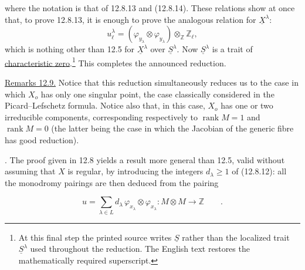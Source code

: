 \noindent
where the notation is that of 12.8.13 and (12.8.14). These relations show
at once that, to prove 12.8.13, it is enough to prove the analogous
relation for $\underline X^\lambda$:
\[
 u_\ell^\lambda=
 (\varphi_{y_\lambda}\otimes\varphi_{y_\lambda})
 \otimes_{\mathbb Z}\mathbb Z_\ell,
\]
which is nothing other than 12.5 for $\underline X^\lambda$ over
$\underline S^\lambda$. Now $\underline S^\lambda$ is a trait of
\underline{characteristic zero}.\footnote{At this final step the printed
source writes $\underline S$ rather than the localized trait
$\underline S^\lambda$ used throughout the reduction. The English text
restores the mathematically required superscript.} This completes the
announced reduction.

\medskip
\noindent
\underline{Remarks 12.9.} Notice that this reduction simultaneously
reduces us to the case in which $X_o$ has only one singular point, the case
classically considered in the Picard--Lefschetz formula. Notice also that,
in this case, $X_o$ has one or two irreducible components, corresponding
respectively to $\operatorname{rank}M=1$ and $\operatorname{rank}M=0$ (the
latter being the case in which the Jacobian of the generic fibre has good
reduction).

\medskip
{}. The proof given in 12.8 yields a result more general than 12.5,
valid without assuming that $X$ is regular, by introducing the integers
$d_\lambda\geqslant1$ of (12.8.12): all the monodromy pairings are then
deduced from the pairing

\begin{equation}\tag{12.10.1}
 u=\sum_{\lambda\in L}d_\lambda\,
   \varphi_{x_\lambda}\otimes\varphi_{x_\lambda}:
   M\otimes M\longrightarrow\mathbb Z\qquad .
\end{equation}
